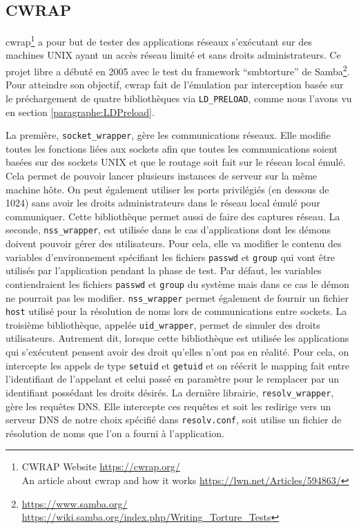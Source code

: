 \subsection{CWRAP}
\label{subsection:cwrap}

cwrap\footnote{CWRAP Website \url{https://cwrap.org/} \\ An article about cwrap and how it works \url{https://lwn.net/Articles/594863/}} a pour but de tester des applications réseaux
s'exécutant sur des machines UNIX ayant un accès réseau limité et sans droits
administrateurs. Ce projet libre a débuté en 2005 avec le test du framework
``smbtorture'' de Samba\footnote{\url{https://www.samba.org/}
  \\ \url{https://wiki.samba.org/index.php/Writing\_Torture\_Tests}}. Pour
atteindre son objectif, cwrap fait de l'émulation par interception basée sur le
préchargement de quatre bibliothèques via \texttt{LD\_PRELOAD}, comme nous
l'avons vu en section \ref{paragraphe:LDPreload}.

La première, \texttt{socket\_wrapper}, gère les communications
réseaux. Elle modifie toutes les fonctions liées aux sockets afin que toutes les
communications soient basées sur des sockets UNIX et que le routage soit fait
sur le réseau local émulé. Cela permet de pouvoir lancer plusieurs instances de
serveur sur la même machine hôte. On peut également utiliser les ports
privilégiés (en dessous de 1024) sans avoir les droits administrateurs dans le
réseau local émulé pour communiquer. Cette bibliothèque permet aussi de faire
des captures réseau. La seconde, \texttt{nss\_wrapper}, est
utilisée dans le cas d'applications dont les démons doivent pouvoir gérer des
utilisateurs. Pour cela, elle va modifier le contenu des variables
d'environnement spécifiant les fichiers \texttt{passwd} et \texttt{group} qui
vont être utilisés par l'application pendant la phase de test. Par défaut, les
variables contiendraient les fichiers \texttt{passwd} et \texttt{group} du
système mais dans ce cas le démon ne pourrait pas les
modifier. \texttt{nss\_wrapper} permet également de fournir un fichier
\texttt{host} utilisé pour la résolution de noms lors de communications entre
sockets. La troisième bibliothèque, appelée \texttt{uid\_wrapper},
permet de simuler des droits utilisateurs. Autrement dit, lorsque cette
bibliothèque est utilisée les applications qui s'exécutent pensent avoir des
droit qu'elles n'ont pas en réalité. Pour cela, on intercepte les appels de type
\texttt{setuid} et \texttt{getuid} et on réécrit le mapping fait entre
l'identifiant de l'appelant et celui passé en paramètre pour le remplacer par un
identifiant possédant les droits désirés. La dernière librairie,
\texttt{resolv\_wrapper}, gère les requêtes DNS. Elle intercepte
ces requêtes et soit les redirige vers un serveur DNS de notre choix spécifié
dans \texttt{resolv.conf}, soit utilise un fichier de résolution de noms que
l'on a fourni à l'application.

